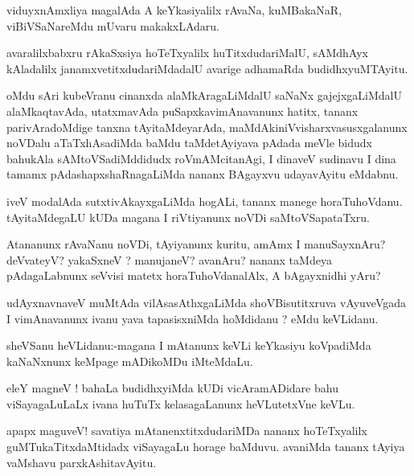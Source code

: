 \documentclass{article}
\begin{document}
\begin{mn}%
viduyxnAmxliya magalAda A keYkasiyalilx rAvaNa, kuMBakaNaR, viBiVSaNareMdu mUvaru 
makakxLAdaru.
\end{mn}

\begin{mn}%
avaralilxbabxru rAkaSxsiya hoTeTxyalilx huTitxdudariMalU, sAMdhAyx kAladalilx 
janamxvetitxdudariMdadalU avarige adhamaRda budidhxyuMTAyitu.
\end{mn}

\begin{mn}%
oMdu sAri kubeVranu cinanxda alaMkAragaLiMdalU saNaNx gajejxgaLiMdalU alaMkaqtavAda, 
utatxmavAda puSapxkavimAnavanunx hatitx, tananx parivAradoMdige tanxna tAyitaMdeyarAda, 
maMdAkiniVvisharxvasusxgalanunx noVDalu aTaTxhAsadiMda baMdu taMdetAyiyava pAdada meVle 
bidudx bahukAla sAMtoVSadiMddidudx roVmAMcitanAgi, I dinaveV sudinavu I dina tamamx 
pAdashapxshaRnagaLiMda nananx BAgayxvu udayavAyitu eMdabnu.
\end{mn}

\begin{mn}%
iveV modalAda sutxtivAkayxgaLiMda hogALi, tananx manege horaTuhoVdanu. tAyitaMdegaLU kUDa 
magana I riVtiyanunx noVDi saMtoVSapataTxru.
\end{mn}

\begin{mn}%
Atananunx rAvaNanu noVDi, tAyiyanunx kuritu, amAmx I manuSayxnAru? deVvateyV? yakaSxneV ? 
manujaneV? avanAru? nananx taMdeya pAdagaLabnunx seVvisi matetx horaTuhoVdanalAlx, A 
bAgayxnidhi yAru?
\end{mn}

\begin{mn}%
udAyxnavnaveV muMtAda vilAsasAthxgaLiMda shoVBisutitxruva vAyuveVgada I vimAnavanunx ivanu 
yava tapasisxniMda hoMdidanu ? eMdu keVLidanu.
\end{mn}

\begin{mn}%
sheVSanu heVLidanu:-magana I mAtanunx keVLi keYkasiyu koVpadiMda kaNaNxnunx keMpage 
mADikoMDu iMteMdaLu.
\end{mn}

\begin{mn}%
eleY magneV ! bahaLa budidhxyiMda kUDi vicAramADidare bahu viSayagaLuLaLx ivana huTuTx 
kelasagaLanunx heVLutetxVne keVLu.
\end{mn}

\begin{mn}%
apapx maguveV! savatiya mAtanenxtitxdudariMDa nananx hoTeTxyalilx guMTukaTitxdaMtidadx 
viSayagaLu horage baMduvu. avaniMda tananx tAyiya vaMshavu parxkAshitavAyitu.
\end{mn}
\end{document}
